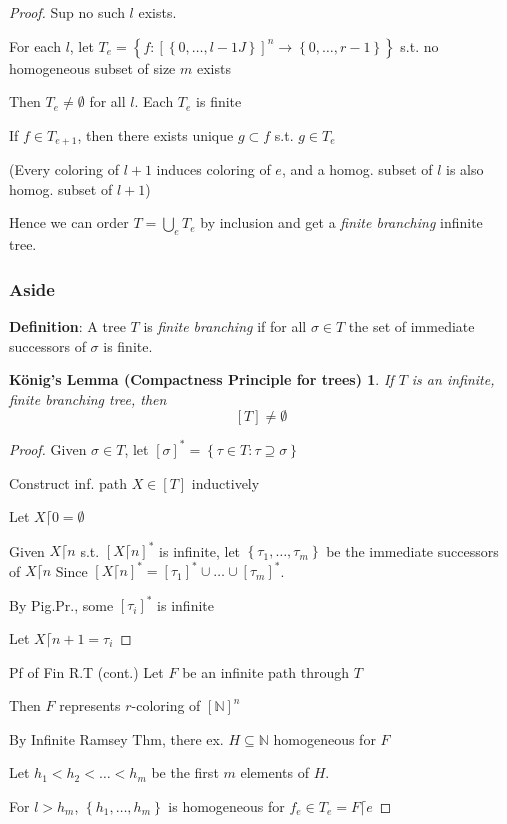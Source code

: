 \documentclass[12pt]{article}
\newcommand{\Nat}{\ensuremath{\mathbb{N}}}
\newcommand{\defn}{\textbf{Definition}: }
\begin{document}
\begin{proof}
  Sup no such $l$ exists.
  
  For each $l$, let
  $T_e = \left\{ f: \left[ \left\{ 0, \dots, l-1J \right\} \right]^n \rightarrow \left\{ 0, \dots, r-1 \right\}\right\}$
  s.t. no homogeneous subset of size $m$ exists

  Then $T_e \ne \emptyset$ for all $l$.
  Each $T_e$ is finite

  If $f \in T_{e+1}$, then there exists unique $g \subset f$ s.t. $g \in T_e$

  (Every coloring of $l+1$ induces coloring of $e$, and a homog. subset of $l$ is also homog. subset of $l+1$)

  Hence we can order $T = \bigcup_{e} T_e$ by inclusion and get a \emph{finite branching} infinite tree.


\subsubsection*{Aside}
  \defn A tree $T$ is \emph{finite branching} if for all $\sigma \in T$
  the set of immediate successors of $\sigma$ is finite.

\newtheorem*{konig}{K\"onig's Lemma (Compactness Principle for trees)}
\begin{konig}
  If $T$ is an infinite, finite branching tree, then
  \[
      [T] \ne \emptyset
  \] %
\end{konig}
\begin{proof}
  Given $\sigma \in T$, let $[\sigma]^* = \left\{ \tau \in T : \tau \supseteq \sigma \right\}$

  Construct inf. path $X \in [T]$ inductively

  Let $X \lceil 0 = \emptyset$

  Given $X \lceil n$ s.t. $[ X \lceil n]^*$ is infinite,
  let $\left\{ \tau_1, \dots, \tau_m \right\}$ be the immediate successors of $X \lceil n$
  Since $[X \lceil n]^* = [\tau_1]^* \cup \dots \cup [\tau_m]^*$.

  By Pig.Pr., some $[\tau_i]^*$ is infinite

  Let $X \lceil n+1 = \tau_i$
\end{proof}

Pf of Fin R.T (cont.)
Let $F$ be an infinite path through $T$

Then $F$ represents $r$-coloring of $[\Nat]^n$

By Infinite Ramsey Thm, there ex. $H \subseteq \Nat$ homogeneous for $F$

Let $h_1 < h_2 < \dots < h_m$ be the first $m$ elements of $H$.

For $l > h_m$, $\left\{ h_1, \dots, h_m \right\}$ is homogeneous for $f_e \in T_e= F\lceil e$
\end{proof}
\end{document}
